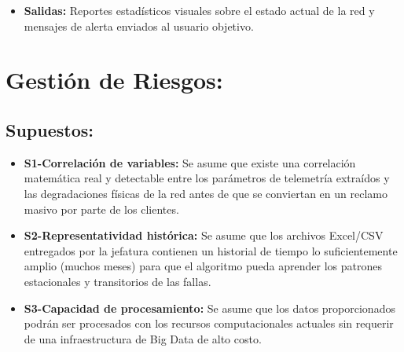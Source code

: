 \documentclass[12pt,a4paper]{article}
\begin{document}
\begin{itemize}
\begin{itemize}
\begin{itemize}
                \item Empaquetar los gráficos de distribución en un reporte.
                \item Enviar el reporte a través de canales de comunicación por correo electrónico.
            \end{itemize}
            \item \textbf{Salidas:} Reportes estadísticos visuales sobre el estado actual de la red y mensajes de alerta enviados al usuario objetivo.
        \end{itemize}
    \end{itemize}
                

\section{Gestión de Riesgos:}

        \subsection{\textbf{Supuestos:}}
                    \begin{itemize}
                        \item \textbf{S1-Correlación de variables:} Se asume que existe una correlación matemática real y detectable entre los parámetros de telemetría extraídos y las degradaciones físicas de la red antes de que se conviertan en un reclamo masivo por parte de los clientes.
                        \item \textbf{S2-Representatividad histórica:} Se asume que los archivos Excel/CSV entregados por la jefatura contienen un historial de tiempo lo suficientemente amplio (muchos meses) para que el algoritmo pueda aprender los patrones estacionales y transitorios de las fallas.
                        \item \textbf{S3-Capacidad de procesamiento:} Se asume que los datos proporcionados podrán ser procesados con los recursos computacionales actuales sin requerir de una infraestructura de Big Data de alto costo.
                    \end{itemize}
\end{document}
